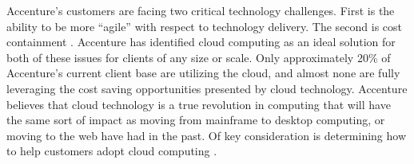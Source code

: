 Accenture's customers are facing two critical technology challenges. First is the ability to be more ``agile'' with respect to technology delivery. The second is cost containment \parencite{bohmannServiceAgilityAssessment2005}. Accenture has identified cloud computing as an ideal solution for both of these issues for clients of any size or scale. Only approximately 20\% of Accenture's current client base are utilizing the cloud, and almost none are fully leveraging the cost saving opportunities presented by cloud technology. Accenture believes that cloud technology is a true revolution in computing that will have the same sort of impact as moving from mainframe to desktop computing, or moving to the web have had in the past. Of key consideration is determining how to help customers adopt cloud computing \parencite{vuPredictorsCloudComputing2020}.
